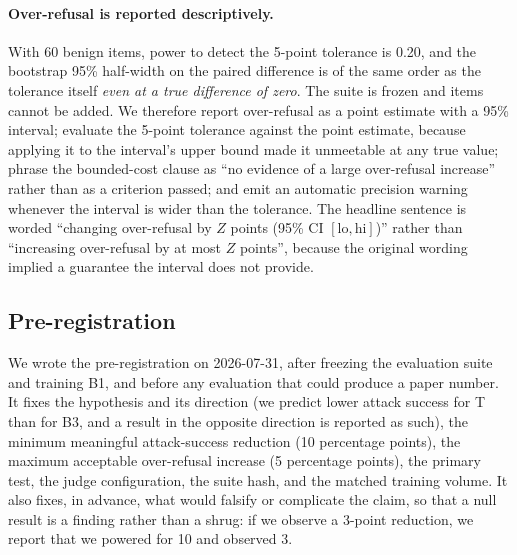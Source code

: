 \paragraph{Over-refusal is reported descriptively.} With 60 benign items, power to detect
the 5-point tolerance is 0.20, and the bootstrap 95\% half-width on the paired difference
is of the same order as the tolerance itself \emph{even at a true difference of zero}.
The suite is frozen and items cannot be added. We therefore report over-refusal as
a point estimate with a 95\% interval; evaluate the 5-point tolerance against the point
estimate, because applying it to the interval's upper bound made it unmeetable at any true
value; phrase the bounded-cost clause as ``no evidence of a large over-refusal increase''
rather than as a criterion passed; and emit an automatic precision warning whenever the
interval is wider than the tolerance. The headline sentence is worded ``changing
over-refusal by $Z$ points (95\% CI $[\text{lo}, \text{hi}]$)'' rather than ``increasing
over-refusal by at most $Z$ points'', because the original wording implied a guarantee the
interval does not provide.

\subsection{Pre-registration}
\label{sec:methods:prereg}

We wrote the pre-registration on 2026-07-31, after freezing the evaluation suite and
training B1, and before any evaluation that could produce a paper number. It fixes the
hypothesis and its direction (we predict lower attack success for T than for B3, and a
result in the opposite direction is reported as such), the minimum meaningful
attack-success reduction (10 percentage points), the maximum acceptable over-refusal
increase (5 percentage points), the primary test, the judge configuration, the suite hash,
and the matched training volume. It also fixes, in advance, what would falsify or
complicate the claim, so that a null result is a finding rather than a shrug: if we
observe a 3-point reduction, we report that we powered for 10 and observed 3.

